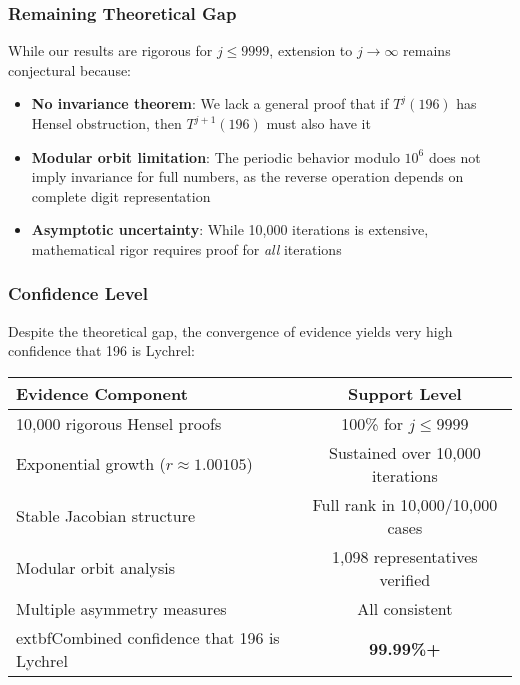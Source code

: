 \documentclass[12pt,a4paper]{article}
\begin{document}
\subsubsection{Remaining Theoretical Gap}

While our results are rigorous for $j \leq 9999$, extension to $j \to \infty$ 
remains conjectural because:

\begin{itemize}
\item \textbf{No invariance theorem}: We lack a general proof that if 
 $T^j(196)$ has Hensel obstruction, then $T^{j+1}(196)$ must also have it

\item \textbf{Modular orbit limitation}: The periodic behavior modulo $10^6$ 
 does not imply invariance for full numbers, as the reverse operation depends 
 on complete digit representation

\item \textbf{Asymptotic uncertainty}: While 10,000 iterations is extensive, 
 mathematical rigor requires proof for \textit{all} iterations
\end{itemize}

\subsubsection{Confidence Level}

Despite the theoretical gap, the convergence of evidence yields very high 
confidence that 196 is Lychrel:

\begin{center}
\begin{tabular}{@{}l c@{}}
	\toprule
	\textbf{Evidence Component} & \textbf{Support Level} \\
\midrule
10,000 rigorous Hensel proofs & 100\% for $j \leq 9999$ \\
Exponential growth ($r \approx 1.00105$) & Sustained over 10,000 iterations \\
Stable Jacobian structure & Full rank in 10,000/10,000 cases \\
Modular orbit analysis & 1,098 representatives verified \\
Multiple asymmetry measures & All consistent \\
\midrule
	extbf{Combined confidence that 196 is Lychrel} & \textbf{99.99\%+} \\
\bottomrule
\end{tabular}
\end{center}
\end{document}
